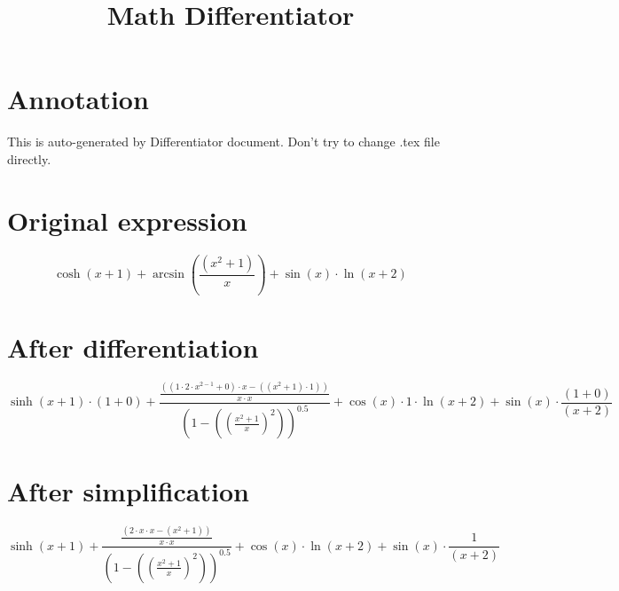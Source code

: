 \documentclass[a4paper,12pt]{article}
\title{\textbf{Math Differentiator}}
\date{}
\author{\text{Kaplin Artyom, B01-402}}
\begin{document}
\maketitle

\section*{Annotation}
This is auto-generated by Differentiator document. Don't try to change .tex file directly.

\section*{Original expression}

\[\cosh{\left({x}{+}{1}\right)}{+}\arcsin{\left(\frac{\left({x}^{{2}}{+}{1}\right)}{{x}}\right)}{+}\sin{\left({x}\right)}{\cdot}\ln{\left({x}{+}{2}\right)}\]

\section*{After differentiation}

\[\sinh{\left({x}{+}{1}\right)}{\cdot}\left({1}{+}{0}\right){+}\frac{\frac{\left(\left({1}{\cdot}{2}{\cdot}{x}^{{2}{-}{1}}{+}{0}\right){\cdot}{x}{-}\left(\left({x}^{{2}}{+}{1}\right){\cdot}{1}\right)\right)}{{x}{\cdot}{x}}}{\left({1}{-}\left(\left(\frac{{x}^{{2}}{+}{1}}{{x}}\right)^{{2}}\right)\right)^{{0.5}}}{+}\cos{\left({x}\right)}{\cdot}{1}{\cdot}\ln{\left({x}{+}{2}\right)}{+}\sin{\left({x}\right)}{\cdot}\frac{\left({1}{+}{0}\right)}{\left({x}{+}{2}\right)}\]

\section*{After simplification}

\[\sinh{\left({x}{+}{1}\right)}{+}\frac{\frac{\left({2}{\cdot}{x}{\cdot}{x}{-}\left({x}^{{2}}{+}{1}\right)\right)}{{x}{\cdot}{x}}}{\left({1}{-}\left(\left(\frac{{x}^{{2}}{+}{1}}{{x}}\right)^{{2}}\right)\right)^{{0.5}}}{+}\cos{\left({x}\right)}{\cdot}\ln{\left({x}{+}{2}\right)}{+}\sin{\left({x}\right)}{\cdot}\frac{{1}}{\left({x}{+}{2}\right)}\]
\end{document}
